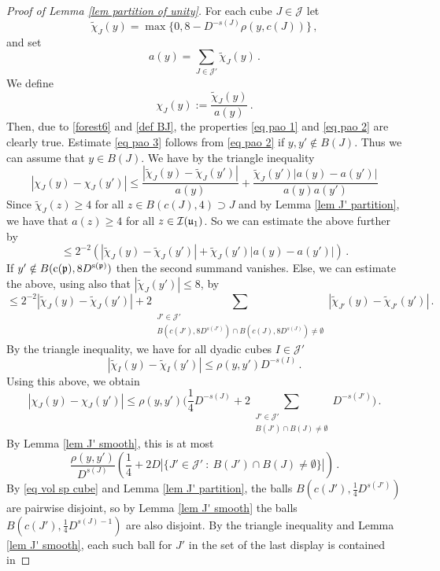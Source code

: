 {    \begin{proof}[Proof of Lemma \ref{lem partition of unity}]
        For each cube $J \in \mathcal{J}$ let
        $$
            \tilde\chi_J(y) = \max\{0, 8 - D^{-s(J)} \rho(y, c(J))\}\,,
        $$
        and set
        $$
            a(y) = \sum_{J \in \mathcal{J}'} \tilde \chi_J(y)\,.
        $$
        We define
        \[
            \chi_J(y) := \frac{\tilde \chi_J(y)}{a(y)}\,.
        \]
        Then, due to \eqref{forest6} and \eqref{def BJ}, the properties \eqref{eq pao 1} and \eqref{eq pao 2} are clearly true. Estimate \eqref{eq pao 3} follows from \eqref{eq pao 2} if $y, y' \notin B(J)$. Thus we can assume that $y \in B(J)$. We have by the triangle inequality
        $$
            |\chi_J(y) - \chi_J(y')| \le \frac{|\tilde \chi_J(y) - \tilde \chi_J(y')|}{a(y)} + \frac{\tilde \chi_J(y')|a(y) - a(y')|}{a(y)a(y')}
        $$
        Since $\tilde \chi_J(z) \ge 4$ for all $z \in B(c(J), 4) \supset J$ and by Lemma \ref{lem J' partition}, we have that $a(z) \ge 4$ for all $z \in \mathcal{I}(\mathfrak u_1)$. So we can estimate the above further by
        $$
            \le 2^{-2}(|\tilde \chi_J(y) - \tilde \chi_J(y')| + \tilde \chi_J(y')|a(y) - a(y')|)\,.
        $$
        If $y' \notin B(\mathrm{c}(\mathfrak p), 8D^{\mathrm{s}(\mathfrak p)})$ then the second summand vanishes. Else, we can estimate the above, using also that $|\tilde \chi_J(y')| \le 8$, by
        $$
            \le 2^{-2} |\tilde \chi_J(y) - \tilde \chi_J(y')| + 2 \sum_{\substack{J' \in \mathcal{J}'\\ B(c(J'), 8D^{s(J')}) \cap B(c(J), 8D^{s(J)}) \ne \emptyset}}|\tilde \chi_{J'}(y) - \tilde \chi_{J'} (y')|\,.
        $$
        By the triangle inequality, we have for all dyadic cubes $I \in \mathcal{J}'$
        $$
            |\tilde \chi_I(y) - \tilde \chi_I(y')| \le \rho(y, y') D^{-s(I)}\,.
        $$
        Using this above, we obtain
        $$
            |\chi_J(y) - \chi_J(y')| \le \rho(y,y') \Big( \frac{1}{4} D^{-s(J)} + 2 \sum_{\substack{J' \in \mathcal{J}'\\ B(J') \cap B(J) \ne \emptyset}} D^{-s(J')}\Big)\,.
        $$
        By Lemma \ref{lem J' smooth}, this is at most
        $$
             \frac{\rho(y,y')}{D^{s(J)}} \left( \frac{1}{4} + 2D |\{J' \in \mathcal{J}' \ : \  B(J') \cap B(J) \ne \emptyset\}|\right)\,.
        $$
        By \eqref{eq vol sp cube} and Lemma \ref{lem J' partition}, the balls $B(c(J'), \frac{1}{4} D^{s(J')})$ are pairwise disjoint, so by Lemma \ref{lem J' smooth} the balls $B(c(J'), \frac{1}{4} D^{s(J) - 1})$ are also disjoint. By the triangle inequality and Lemma \ref{lem J' smooth}, each such ball for $J'$ in the set of the last display is contained in

\end{proof}}
